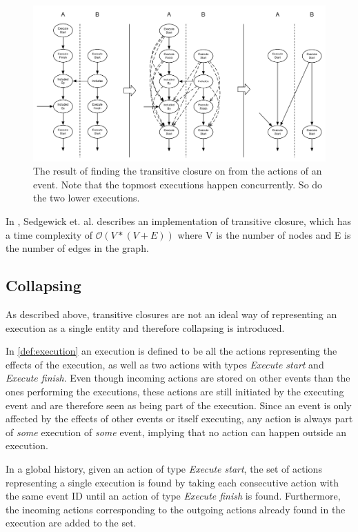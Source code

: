 	\begin{figure}[H]
		\centering
		\includegraphics[width=\textwidth]{5orderofexecution/images/trans.pdf}
		\caption{The result of finding the transitive closure on from the actions of an event. Note that the topmost executions happen concurrently. So do the two lower executions.}
		\label{fig:problem:trans}
	\end{figure}
	
	\newpar In \cite{sedgewick2011algorithms}, Sedgewick et. al. describes an implementation of transitive closure, which has a time complexity of $\mathcal{O}(V * (V + E))$ where V is the number of nodes and E is the number of edges in the graph.
	
	\subsection{Collapsing}
	As described above, transitive closures are not an ideal way of representing an execution as a single entity and therefore collapsing is introduced.
	
	\newpar In \autoref{def:execution} an execution is defined to be all the actions representing the effects of the execution, as well as two actions with types \textit{Execute start} and \textit{Execute finish}. Even though incoming actions are stored on other events than the ones performing the executions, these actions are still initiated by the executing event and are therefore seen as being part of the execution. Since an event is only affected by the effects of other events or itself executing, any action is always part of \textit{some} execution of \textit{some} event, implying that no action can happen outside an execution.

	\newpar In a global history, given an action of type \textit{Execute start}, the set of actions representing a single execution is found by taking each consecutive action with the same event ID until an action of type \textit{Execute finish} is found. Furthermore, the incoming actions corresponding to the outgoing actions already found in the execution are added to the set.
	
